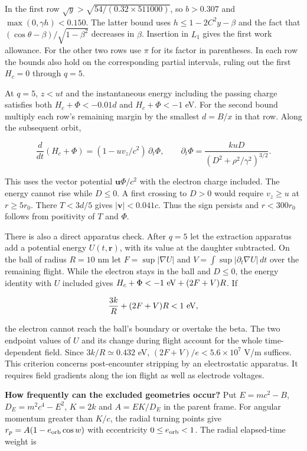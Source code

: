 \documentclass[11pt,a4paper]{article}
\begin{document}
In the first row \(\sqrt y>\sqrt{54/(0.32\times511000)}\), so
\(b>0.307\) and \(\max(0,\gamma h)<0.150\). The latter bound uses
\(h\le1-2C^2y-\beta\) and the fact that
\((\cos\theta-\beta)/\sqrt{1-\beta^2}\) decreases in \(\beta\).
Insertion in \(L_1\) gives the first work allowance. For the other two
rows use \(\pi\) for its factor in parentheses. In each row the bounds
also hold on the corresponding partial intervals, ruling out the first
\(H_c=0\) through \(q=5\).

At \(q=5\), \(z<ut\) and the instantaneous energy including the passing
charge satisfies both \(H_c+\Phi<-0.01d\) and \(H_c+\Phi<-1\) eV. For
the second bound multiply each row's remaining margin by the smallest
\(d=B/x\) in that row. Along the subsequent orbit,

\[
 \frac{d}{dt}(H_c+\Phi)
    =(1-u v_z/c^2)\,\partial_t\Phi,\qquad
 \partial_t\Phi=\frac{kuD}{(D^2+\rho^2/\gamma^2)^{3/2}} .
\]

This uses the vector potential \(\boldsymbol u\Phi/c^2\) with the
electron charge included. The energy cannot rise while \(D\le0\). A
first crossing to \(D>0\) would require \(v_z\ge u\) at \(r\ge5r_0\).
There \(T<3d/5\) gives \(|\boldsymbol v|<0.041c\). Thus the sign
persists and \(r<300r_0\) follows from positivity of \(T\) and \(\Phi\).

There is also a direct apparatus check. After \(q=5\) let the extraction
apparatus add a potential energy \(U(t,\boldsymbol r)\), with its value
at the daughter subtracted. On the ball of radius \(R=10\) nm let
\(F=\sup|\nabla U|\) and \(V=\int\sup|\partial_t\nabla U|\,dt\) over the
remaining flight. While the electron stays in the ball and \(D\le0\),
the energy identity with \(U\) included gives
\(H_c+\Phi<-1\ {\rm eV}+(2F+V)R\). If

\[
        \frac{3k}{R}+(2F+V)R<1\ {\rm eV},
\]

the electron cannot reach the ball's boundary or overtake the beta. The
two endpoint values of \(U\) and its change during flight account for
the whole time-dependent field. Since \(3k/R\simeq0.432\) eV,
\((2F+V)/e<5.6\times10^7\) V/m suffices. This criterion concerns
post-encounter stripping by an electrostatic apparatus. It requires
field gradients along the ion flight as well as electrode voltages.

\textbf{How frequently can the excluded geometries occur?} Put
\(E=mc^2-B\), \(D_E=m^2c^4-E^2\), \(K=2k\) and \(A=EK/D_E\) in the
parent frame. For angular momentum greater than \(K/c\), the radial
turning points give \(r_p=A(1-e_{\rm orb}\cos w)\) with eccentricity
\(0\le e_{\rm orb}<1\). The radial elapsed-time weight is
\end{document}
